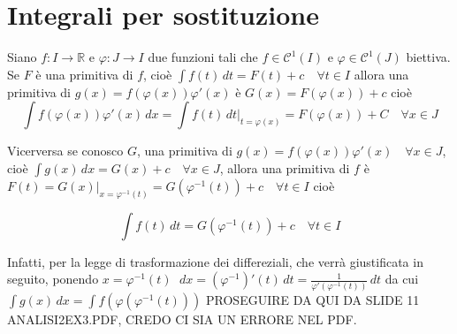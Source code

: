 \documentclass{article}
\theoremstyle{definition}
\theoremstyle{definition}
\theoremstyle{definition}
\theoremstyle{definition}
\theoremstyle{definition}
\theoremstyle{definition}
\begin{document}
\newpage
\section{Integrali per sostituzione}

Siano $f:I\rightarrow\mathbb{R}$ e $\varphi:J\rightarrow I$ due funzioni tali che $f\in\mathcal{C}^1(I)$ e $\varphi\in\mathcal{C}^1(J)$ biettiva. Se $F$ è una primitiva di $f$, cioè $\displaystyle{\int f(t)\,dt=F(t)+c \quad \forall t\in I}$ allora una primitiva di $g(x)=f(\varphi(x))\varphi'(x)$ è $G(x)=F(\varphi(x))+c$ cioè
\[\int f(\varphi(x))\varphi'(x)\,dx = \int f(t)\,dt\bigg|_{t=\varphi(x)}=F(\varphi(x))+C \quad \forall x\in J\]

Vicerversa se conosco $G$, una primitiva di $g(x)=f(\varphi(x))\varphi'(x) \quad \forall x\in J$, cioè $\int g(x)\,dx=G(x)+c \quad \forall x \in J$, allora una primitiva di $f$ è $F(t)=G(x)\bigg|_{x=\varphi^{-1}(t)}=G(\varphi^{-1}(t))+c \quad \forall t \in I$ cioè

\[\int f(t)\,dt=G(\varphi^{-1}(t))+c \quad \forall t\in I\]

Infatti, per la legge di trasformazione dei differeziali, che verrà giustificata in seguito, ponendo $x=\varphi^{-1}(t)$ $\displaystyle{\;dx=(\varphi^{-1})'(t)\,dt=\frac{1}{\varphi'(\varphi^{-1}(t))}\,dt}$ da cui $\int g(x)\,dx=\int f(\varphi(\varphi^{-1}(t)))$ PROSEGUIRE DA QUI DA SLIDE 11 ANALISI2EX3.PDF, CREDO CI SIA UN ERRORE NEL PDF.

\vspace{3mm}
\end{document}
